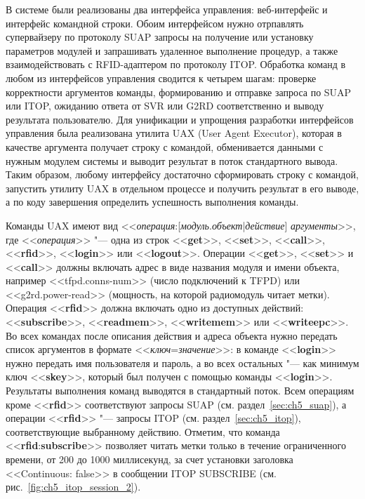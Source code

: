 В системе были реализованы два интерфейса управления: веб-интерфейс и интерфейс командной строки. Обоим интерфейсом нужно отрпавлять супервайзеру по протоколу SUAP запросы на получение или установку параметров модулей и запрашивать удаленное выполнение процедур, а также взаимодействовать с RFID-адаптером по протоколу ITOP. Обработка команд в любом из интерфейсов управления сводится к четырем шагам: проверке корректности аргументов команды, формированию и отправке запроса по SUAP или ITOP, ожиданию ответа от SVR или G2RD соответственно и выводу результата пользователю. Для унификации и упрощения разработки интерфейсов управления была реализована утилита UAX (User Agent Executor), которая в качестве аргумента получает строку с командой, обменивается данными с нужным модулем системы и выводит результат в поток стандартного вывода. Таким образом, любому интерфейсу достаточно сформировать строку с командой, запустить утилиту UAX в отдельном процессе и получить результат в его выводе, а по коду завершения определить успешность выполнения команды.

Команды UAX имеют вид  <<\textit{операция}:[\textit{модуль}.\textit{объект}|\textit{действие}] \textit{аргументы}>>, где <<\textit{операция}>> "--- одна из строк <<\textbf{get}>>, <<\textbf{set}>>, <<\textbf{call}>>, <<\textbf{rfid}>>, <<\textbf{login}>> или <<\textbf{logout}>>. Операции <<\textbf{get}>>, <<\textbf{set}>> и <<\textbf{call}>> должны включать адрес в виде названия модуля и имени объекта, например <<tfpd.conns-num>> (число подключений к TFPD) или <<g2rd.power-read>> (мощность, на которой радиомодуль читает метки). Операция <<\textbf{rfid}>> должна включать одно из доступных действий: <<\textbf{subscribe}>>, <<\textbf{readmem}>>, <<\textbf{writemem}>> или <<\textbf{writeepc}>>. Во всех командах после описания действия и адреса объекта нужно передать список аргументов в формате <<\textit{ключ}=\textit{значение}>>: в команде <<\textbf{login}>> нужно передать имя пользователя и пароль, а во всех остальных "--- как минимум ключ <<\textbf{skey}>>, который был получен с помощью команды <<\textbf{login}>>. Результаты выполнения команд выводятся в стандартный поток. Всем операциям кроме <<\textbf{rfid}>> соответствуют запросы SUAP (см. раздел~\ref{sec:ch5_suap}), а операции <<\textbf{rfid}>> "--- запросы ITOP (см. раздел~\ref{sec:ch5_itop}), соответствующие выбранному действию. Отметим, что команда <<\textbf{rfid}:\textbf{subscribe}>> позволяет читать метки только в течение ограниченного времени, от 200 до 1000 миллисекунд, за счет установки заголовка <<Continuous: false>> в сообщении ITOP SUBSCRIBE (см. рис.~\ref{fig:ch5_itop_session_2}).

